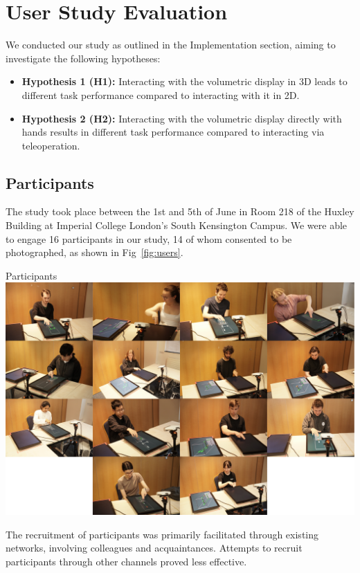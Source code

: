 \section{User Study Evaluation}

We conducted our study as outlined in the Implementation section, aiming to investigate the following hypotheses:

\begin{itemize}[itemsep=-0.3em]
    \item \textbf{Hypothesis 1 (H1):} Interacting with the volumetric display in 3D leads to different task performance compared to interacting with it in 2D.
    \item \textbf{Hypothesis 2 (H2):} Interacting with the volumetric display directly with hands results in different task performance compared to interacting via teleoperation.
\end{itemize}

\subsection{Participants}
The study took place between the 1st and 5th of June in Room 218 of the Huxley Building at Imperial College London's South Kensington Campus. We were able to engage 16 participants in our study, 14 of whom consented to be photographed, as shown in Fig~\ref{fig:users}.

\begin{figureBox}[label={fig:users}, width=0.8\linewidth]{Participants}
    \includegraphics[width = 1.0\linewidth]{./evaluation/figures/users.pdf}
\end{figureBox}

The recruitment of participants was primarily facilitated through existing networks, involving colleagues and acquaintances. Attempts to recruit participants through other channels proved less effective. \\

